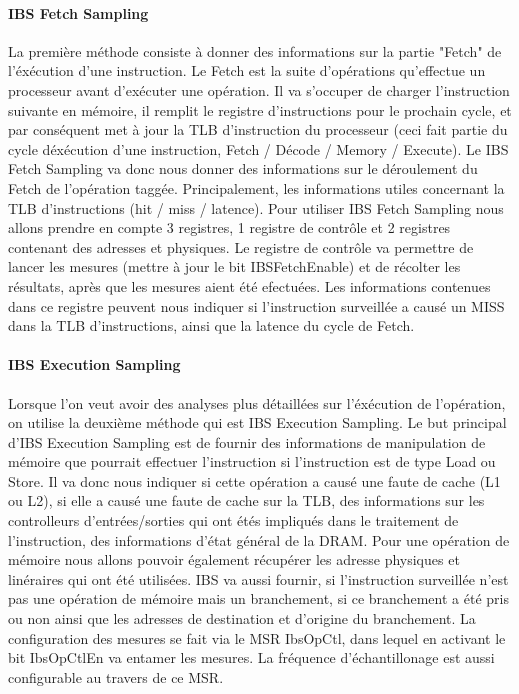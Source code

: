 			\paragraph{IBS Fetch Sampling}
			La première méthode consiste à donner des informations sur la partie "Fetch" de l'éxécution d'une instruction. Le Fetch est la suite d'opérations qu'effectue un processeur avant d'exécuter une opération. Il va s'occuper de charger l'instruction suivante en mémoire, il remplit le registre d'instructions pour le prochain cycle, et par conséquent met à jour la TLB d'instruction du processeur (ceci fait partie du cycle déxécution d'une instruction, Fetch / Décode / Memory / Execute). Le IBS Fetch Sampling va donc nous donner des informations sur le déroulement du Fetch de l'opération taggée. Principalement, les informations utiles concernant la TLB d'instructions (hit / miss / latence). Pour utiliser IBS Fetch Sampling nous allons prendre en compte 3 registres, 1 registre de contrôle et 2 registres contenant des adresses et physiques. Le registre de contrôle va permettre de lancer les mesures (mettre à jour le bit IBSFetchEnable) et de récolter les résultats, après que les mesures aient été efectuées. Les informations contenues dans ce registre peuvent nous indiquer si l'instruction surveillée a causé un MISS dans la TLB d'instructions, ainsi que la latence du cycle de Fetch.\\
			\paragraph{IBS Execution Sampling}
			Lorsque l'on veut avoir des analyses plus détaillées sur l'éxécution de l'opération, on utilise la deuxième méthode qui est IBS Execution Sampling. 			Le but principal d'IBS Execution Sampling est de fournir des informations de manipulation de mémoire que pourrait effectuer l'instruction si l'instruction est de type Load ou Store. Il va donc nous indiquer si cette opération a causé une faute de cache (L1 ou L2), si elle a causé une faute de cache sur la TLB, des informations sur les controlleurs d'entrées/sorties qui ont étés impliqués dans le traitement de l'instruction, des informations d'état général de la DRAM. Pour une opération de mémoire nous allons pouvoir également récupérer les adresse physiques et linéraires qui ont été utilisées. IBS va aussi fournir, si l'instruction surveillée n'est pas une opération de mémoire mais un branchement, si ce branchement a été pris ou non ainsi que les adresses de destination et d'origine du branchement. La configuration des mesures se fait via le MSR IbsOpCtl, dans lequel en activant le bit IbsOpCtlEn va entamer les mesures. La fréquence d'échantillonage est aussi configurable au travers de ce MSR. 

